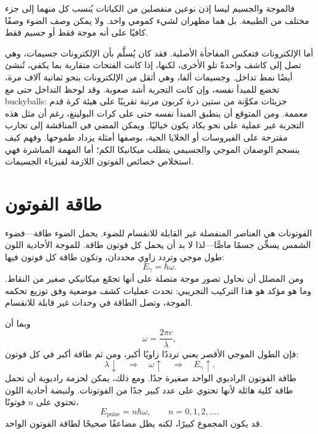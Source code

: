 فالموجة والجسيم ليسا إذن نوعين منفصلين من الكيانات يُنسب كل منهما إلى جزء مختلف من الطبيعة. بل هما مظهران لشيء كمومي واحد. ولا يمكن وصف الضوء وصفًا كافيًا على أنه موجة فقط أو جسيم فقط.

أما الإلكترونات فتعكس المفاجأة الأصلية. فقد كان يُسلَّم بأن الإلكترونات جسيمات، وهي تصل إلى كاشف واحدةً تلو الأخرى، لكنها، إذا كانت الفتحات متقاربة بما يكفي، تُنشئ أيضًا نمط تداخل. وجسيمات ألفا، وهي أثقل من الإلكترونات بنحو ثمانية آلاف مرة، تخضع للمبدأ نفسه، وإن كانت التجربة أشد صعوبة. وقد لوحظ التداخل حتى مع buckyballs: جزيئات مكوَّنة من ستين ذرة كربون مرتبة تقريبًا على هيئة كرة قدم معممة. ومن المتوقع أن ينطبق المبدأ نفسه حتى على كرات البولينغ، رغم أن مثل هذه التجربة غير عملية على نحو يكاد يكون خياليًا. ويمكن المضي في المناقشة إلى تجارب مقترحة على الفيروسات أو الخلايا الحية، بوصفها أمثلة يزداد طموحها. وفهم كيف ينسجم الوصفان الموجي والجسيمي يتطلب ميكانيكا الكم؛ أما المهمة المباشرة فهي استخلاص خصائص الفوتون اللازمة لفيزياء الجسيمات.

\section{طاقة الفوتون}

الفوتونات هي العناصر المنفصلة غير القابلة للانقسام للضوء. يحمل الضوء طاقة---فضوء الشمس يسخِّن جسمًا ماصًّا---لذا لا بد أن يحمل كل فوتون طاقة. للموجة الأحادية اللون طول موجي وتردد زاوي محددان، وتكون طاقة كل فوتون فيها:
\begin{equation}
E_\gamma=\hbar\omega.
\end{equation}
ومن المضلل أن نحاول تصور موجة متصلة على أنها تجمّع ميكانيكي صغير من النقاط. وما هو مؤكد هو هذا التركيب التجريبي: تحدث عمليات كشف موضعية وفق توزيع تحكمه الموجة، وتصل الطاقة في وحدات غير قابلة للانقسام.

وبما أن
\begin{equation}
\omega=\frac{2\pi c}{\lambda},
\end{equation}
فإن الطول الموجي الأقصر يعني ترددًا زاويًا أكبر، ومن ثم طاقة أكبر في كل فوتون:
\begin{equation}
\lambda\downarrow
\quad\Longrightarrow\quad
\omega\uparrow
\quad\Longrightarrow\quad
E_\gamma\uparrow.
\end{equation}
طاقة الفوتون الراديوي الواحد صغيرة جدًا. ومع ذلك، يمكن لحزمة راديوية أن تحمل طاقة كلية هائلة لأنها تحتوي على عدد كبير جدًا من الفوتونات. ولنبضة أحادية اللون تحتوي على \(n\) فوتونًا،
\begin{equation}
E_{\text{pulse}}=n\hbar\omega,
\qquad
n=0,1,2,\ldots.
\end{equation}
قد يكون المجموع كبيرًا، لكنه يظل مضاعفًا صحيحًا لطاقة الفوتون الواحد.

